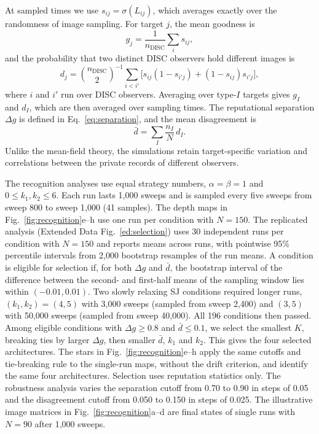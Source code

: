 \documentclass[10pt]{wlscirep}
\newcommand{\DISC}{\mathrm{DISC}}
\theoremstyle{plain}
\theoremstyle{remark}
\begin{document}
At sampled times we use $s_{ij}=\sigma(L_{ij})$, which averages exactly over the randomness of image sampling. For target $j$, the mean goodness is
\begin{equation}
g_j=\frac{1}{n_{\DISC}}\sum_is_{ij},
\label{eq:m-goodness}
\end{equation}
and the probability that two distinct DISC observers hold different images is
\begin{equation}
d_j=\binom{n_{\DISC}}{2}^{-1}\sum_{i<i'}\bigl[s_{ij}(1-s_{i'j})+(1-s_{ij})s_{i'j}\bigr],
\label{eq:m-estimators}
\end{equation}
where $i$ and $i'$ run over DISC observers. Averaging over type-$I$ targets gives $g_I$ and $d_I$, which are then averaged over sampling times. The reputational separation $\Delta g$ is defined in Eq.~\eqref{eq:separation}, and the mean disagreement is
\begin{equation}
\bar d=\sum_I\frac{n_I}{N}\,d_I.
\label{eq:m-recognition}
\end{equation}
Unlike the mean-field theory, the simulations retain target-specific variation and correlations between the private records of different observers.

The recognition analyses use equal strategy numbers, $\alpha=\beta=1$ and $0\leq k_1,k_2\leq6$. Each run lasts 1,000 sweeps and is sampled every five sweeps from sweep 800 to sweep 1,000 (41 samples). The depth maps in Fig.~\ref{fig:recognition}e--h use one run per condition with $N=150$. The replicated analysis (Extended Data Fig.~\ref{ed:selection}) uses 30 independent runs per condition with $N=150$ and reports means across runs, with pointwise 95\% percentile intervals from 2,000 bootstrap resamples of the run means. A condition is eligible for selection if, for both $\Delta g$ and $\bar d$, the bootstrap interval of the difference between the second- and first-half means of the sampling window lies within $(-0.01,0.01)$. Two slowly relaxing SJ conditions required longer runs, $(k_1,k_2)=(4,5)$ with 3,000 sweeps (sampled from sweep 2,400) and $(3,5)$ with 50,000 sweeps (sampled from sweep 40,000). All 196 conditions then passed. Among eligible conditions with $\Delta g\geq0.8$ and $\bar d\leq0.1$, we select the smallest $K$, breaking ties by larger $\Delta g$, then smaller $\bar d$, $k_1$ and $k_2$. This gives the four selected architectures. The stars in Fig.~\ref{fig:recognition}e--h apply the same cutoffs and tie-breaking rule to the single-run maps, without the drift criterion, and identify the same four architectures. Selection uses reputation statistics only. The robustness analysis varies the separation cutoff from 0.70 to 0.90 in steps of 0.05 and the disagreement cutoff from 0.050 to 0.150 in steps of 0.025. The illustrative image matrices in Fig.~\ref{fig:recognition}a--d are final states of single runs with $N=90$ after 1,000 sweeps.
\end{document}
